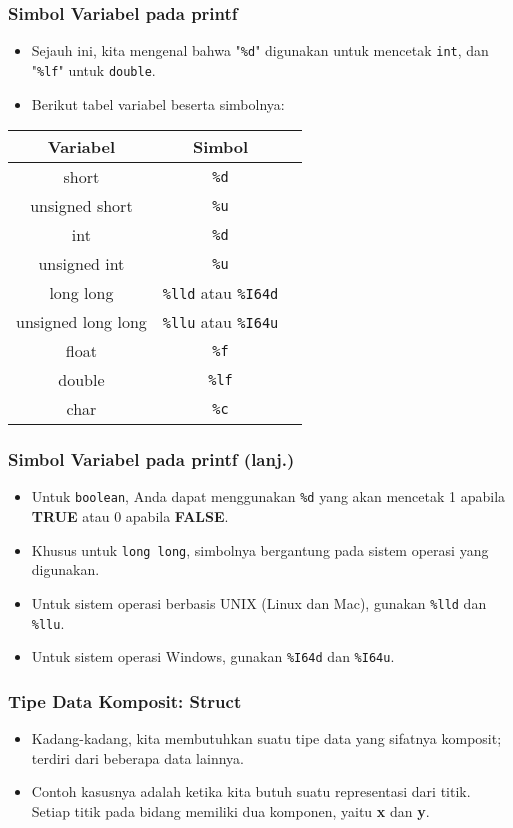 \begin{frame}[fragile]
\frametitle{Simbol Variabel pada printf}
\begin{itemize}
  \item Sejauh ini, kita mengenal bahwa "\texttt{\%d}" digunakan untuk mencetak \texttt{int}, dan "\texttt{\%lf}" untuk \texttt{double}.
  \item Berikut tabel variabel beserta simbolnya:
\end{itemize}
\begin{table}[ht]
  \begin{tabular}{|c|c|c|}
    \hline Variabel  & Simbol \\
    \hline short & \texttt{\%d} \\
    \hline unsigned short & \texttt{\%u} \\
    \hline int & \texttt{\%d} \\
    \hline unsigned int & \texttt{\%u} \\
    \hline long long & \texttt{\%lld} atau \texttt{\%I64d} \\
    \hline unsigned long long & \texttt{\%llu} atau \texttt{\%I64u} \\
    \hline float & \texttt{\%f} \\
    \hline double & \texttt{\%lf} \\
    \hline char &  \texttt{\%c} \\
    \hline
  \end{tabular}
\end{table}
\end{frame}

\begin{frame}[fragile]
\frametitle{Simbol Variabel pada printf (lanj.)}
\begin{itemize}
  \item Untuk \texttt{boolean}, Anda dapat menggunakan \texttt{\%d} yang akan mencetak 1 apabila \textbf{TRUE} atau 0 apabila \textbf{FALSE}.
  \item Khusus untuk \texttt{long long}, simbolnya bergantung pada sistem operasi yang digunakan.
  \item Untuk sistem operasi berbasis UNIX (Linux dan Mac), gunakan \texttt{\%lld} dan \texttt{\%llu}.
  \item Untuk sistem operasi Windows, gunakan \texttt{\%I64d} dan \texttt{\%I64u}.
\end{itemize}
\end{frame}

\begin{frame}
\frametitle{Tipe Data Komposit: Struct}
\begin{itemize}
  \item Kadang-kadang, kita membutuhkan suatu tipe data yang sifatnya komposit; terdiri dari beberapa data lainnya.
  \item Contoh kasusnya adalah ketika kita butuh suatu representasi dari titik. Setiap titik pada bidang memiliki dua komponen, yaitu \textbf{x} dan \textbf{y}.
\end{itemize}
\end{frame}

